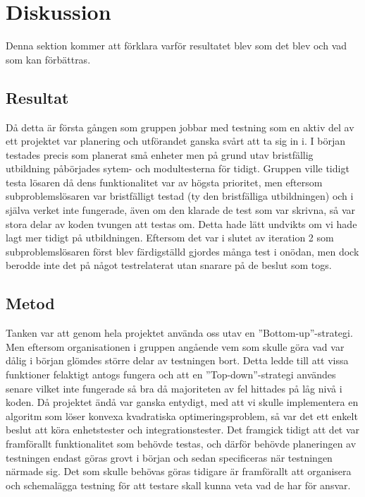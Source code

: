 \section{Diskussion}
	Denna sektion kommer att förklara varför resultatet blev som det blev och vad som kan förbättras.	
	
	\subsection{Resultat}
	Då detta är första gången som gruppen jobbar med testning som en aktiv del av ett projektet var planering och utförandet ganska svårt att ta sig in i. I början testades precis som planerat små enheter men på grund utav bristfällig utbildning påbörjades sytem- och modultesterna för tidigt. Gruppen ville tidigt testa lösaren då dens funktionalitet var av högsta prioritet, men eftersom subproblemslösaren var bristfälligt testad (ty den bristfälliga utbildningen) och i själva verket inte fungerade, även om den klarade de test som var skrivna, så var stora delar av koden tvungen att testas om. Detta hade lätt undvikts om vi hade lagt mer tidigt på utbildningen. Eftersom det var i slutet av iteration 2 som subproblemslösaren först blev färdigställd gjordes många test i onödan, men dock berodde inte det på något testrelaterat utan snarare på de beslut som togs. 
	
	\subsection{Metod}
	Tanken var att genom hela projektet använda oss utav en ''Bottom-up''-strategi. Men eftersom organisationen i gruppen angående vem som skulle göra vad var dålig i början glömdes större delar av testningen bort. Detta ledde till att vissa funktioner felaktigt antogs fungera och att en ''Top-down''-strategi användes senare vilket inte fungerade så bra då majoriteten av fel hittades på låg nivå i koden.
	Då projektet ändå var ganska entydigt, med att vi skulle implementera en algoritm som löser konvexa kvadratiska optimeringsproblem, så var det ett enkelt beslut att köra enhetstester och integrationstester. Det framgick tidigt att det var framförallt funktionalitet som behövde testas, och därför behövde planeringen av testningen endast göras grovt i början och sedan specificeras när testningen närmade sig. Det som skulle behövas göras tidigare är framförallt att organisera och schemalägga testning för att testare skall kunna veta vad de har för ansvar.
